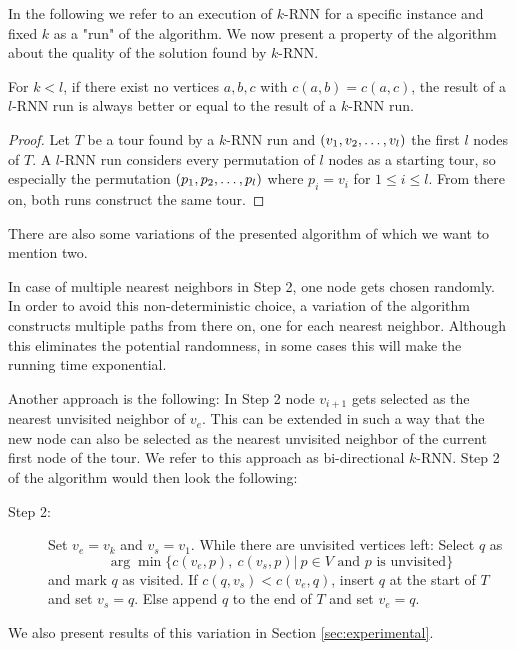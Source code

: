 In the following we refer to an execution of $k$-RNN for a specific instance and fixed $k$ as a "run" of the algorithm.
We now present a property of the algorithm about the quality of the solution found by $k$-RNN.
\begin{theorem}
	\label{theo:quality}
	For $k < l$, if there exist no vertices $a, b, c$ with $c(a, b) = c(a, c)$, the result of a $l$-RNN run is always better or equal to the result of a $k$-RNN run.
\end{theorem}
\begin{proof}
	Let $T$ be a tour found by a $k$-RNN run and $(v_1, v_2, \mathellipsis, v_l)$ the first $l$ nodes of $T$. 
	A $l$-RNN run considers every permutation of $l$ nodes as a starting tour, so especially the permutation $(p_1, p_2, \mathellipsis, p_l)$ where $p_i = v_i$ for $1 \leq i \leq l$. 
	From there on, both runs construct the same tour.
\end{proof}

There are also some variations of the presented algorithm of which we want to mention two.

In case of multiple nearest neighbors in Step 2, one node gets chosen randomly. 
In order to avoid this non-deterministic choice, a variation of the algorithm constructs multiple paths from there on, one for each nearest neighbor. 
Although this eliminates the potential randomness, in some cases this will make the running time exponential.

Another approach is the following:
In Step 2 node $v_{i+1}$ gets selected as the nearest unvisited neighbor of $v_e$. 
This can be extended in such a way that the new node can also be selected as the nearest unvisited neighbor of the current first node of the tour. 
We refer to this approach as bi-directional $k$-RNN. Step 2 of the algorithm would then look the following:

\begin{description}
	\item[Step 2:] Set $v_e = v_k$ and $v_s = v_1$. 
	While there are unvisited vertices left: 
	Select $q$ as 
	\[
	\arg \min\{c(v_e, p),\ c(v_s, p) |\ p \in V \text{ and $p$ is unvisited}\}
	\] 
	and mark $q$ as visited. If $c(q, v_s) < c (v_e, q)$, insert $q$ at the start of $T$ and set $v_s = q$. Else append $q$ to the end of $T$ and set $v_e = q$.
\end{description}

We also present results of this variation in Section \ref{sec:experimental}.
